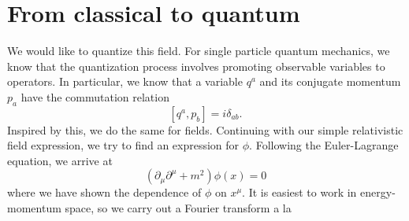 \documentclass{article}
\begin{document}
	\section{From classical to quantum}
	
	We would like to quantize this field. For single particle quantum mechanics, we know that the quantization process involves promoting observable variables to operators.  In particular, we know that a variable $q^a$ and its conjugate momentum $p_a$ have the commutation relation
	\[
		[q^a, p_b] = i\delta_{ab}.
	\]
	Inspired by this, we do the same for fields. Continuing with our simple relativistic field expression, we try to find an expression for $\phi$. Following the Euler-Lagrange equation, we arrive at
	\[
		(\partial_\mu\partial^\mu + m^2)\phi(x) = 0
	\]
	where we have shown the dependence of $\phi$ on $x^\mu$. It is easiest to work in energy-momentum space, so we carry out a Fourier transform a la 
	
	
\end{document}
